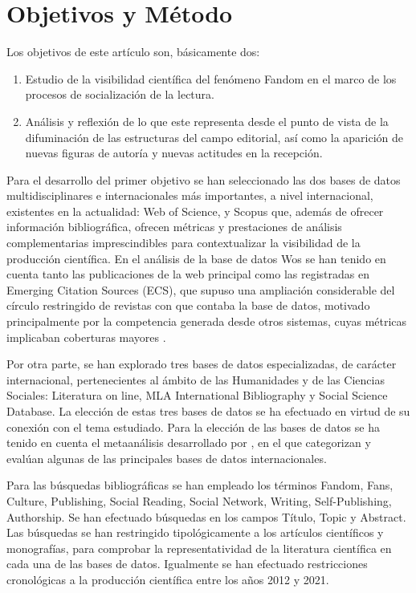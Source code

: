 \documentclass[spanish]{textolivre}
\begin{document}
\section{Objetivos y Método}\label{sec-normas}
Los objetivos de este artículo son, básicamente dos:
\begin{enumerate}[label=\alph*.]
    \item Estudio de la visibilidad científica del fenómeno Fandom en el marco de los procesos de socialización de la lectura.
    \item Análisis y reflexión de lo que este representa desde el punto de vista de la difuminación de las estructuras del campo editorial, así como la aparición de nuevas figuras de autoría y nuevas actitudes en la recepción.
\end{enumerate}

Para el desarrollo del primer objetivo se han seleccionado las dos bases de datos multidisciplinares e internacionales más importantes, a nivel internacional, existentes en la actualidad: Web of Science, y Scopus que, además de ofrecer información bibliográfica, ofrecen métricas y prestaciones de análisis complementarias imprescindibles para contextualizar la visibilidad de la producción científica. En el análisis de la base de datos Wos se han tenido en cuenta tanto las publicaciones de la web principal como las registradas en Emerging Citation Sources (ECS), que supuso una ampliación considerable del círculo restringido de revistas con que contaba la base de datos, motivado principalmente por la competencia generada desde otros sistemas, cuyas métricas implicaban coberturas mayores \cite{somoza-fernandez_journal_2018,de_filippo_is_2020,butt_bibliometric_2021}.

Por otra parte, se han explorado tres bases de datos especializadas, de carácter internacional, pertenecientes al ámbito de las Humanidades y de las Ciencias Sociales: Literatura on line, MLA International Bibliography y Social Science Database. La elección de estas tres bases de datos se ha efectuado en virtud de su conexión con el tema estudiado. Para la elección de las bases de datos se ha tenido en cuenta el metaanálisis desarrollado por \textcite{vuotto_fortalezas_2020}, en el que categorizan y evalúan algunas de las principales bases de datos internacionales.

Para las búsquedas bibliográficas se han empleado los términos Fandom, Fans, Culture, Publishing, Social Reading, Social Network, Writing, Self-Publishing, Authorship. Se han efectuado búsquedas en los campos Título, Topic y Abstract. Las búsquedas se han restringido tipológicamente a los artículos científicos y monografías, para comprobar la representatividad de la literatura científica en cada una de las bases de datos. Igualmente se han efectuado restricciones cronológicas a la producción científica entre los años 2012 y 2021. 
\end{document}

